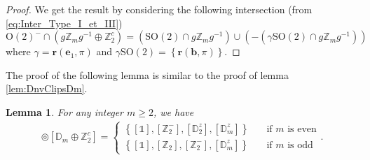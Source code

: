 \documentclass[11pt,a4paper]{amsart}
\newtheorem{lem}[thm]{Lemma}
\theoremstyle{definition}
\newcommand{\ZZ}{\mathbb{Z}}                %
\newcommand{\OO}{\mathrm{O}}                %
\newcommand{\SO}{\mathrm{SO}}               %
\newcommand{\DD}{\mathbb{D}}                %
\newcommand{\1}{\mathds{1}}		            %
\newcommand{\ee}{\pmb{e}}                   %
\newcommand{\vR}{\mathbf{r}}
\newcommand{\bb}{\mathbf{b}}
\newcommand{\set}[1]{\left\{#1\right\}}     %
\begin{document}
\begin{proof}
  We get the result by considering the following intersection (from \eqref{eq:Inter_Type_I_et_III})
  \begin{equation*}
    \OO(2)^-\cap (g\ZZ_m g^{-1} \oplus \ZZ_2^c)=(\SO(2) \cap g \ZZ_m g^{-1})\cup (-(\gamma\SO(2)\cap g\ZZ_mg^{-1}))
  \end{equation*}
  where $\gamma=\vR(\ee_1,\pi)$ and $\gamma\SO(2)=\set{\vR(\bb,\pi)}$.
\end{proof}

The proof of the following lemma is similar to the proof of lemma \ref{lem:DnvClipsDm}.
\begin{lem}
  For any integer $m\geq 2$, we have
  \begin{align*}
    [\OO(2)^-]\circledcirc [\DD_m\oplus \ZZ_2^c]=
    \begin{cases}
      \set{[\1],[\ZZ_2^-],[\DD_2^z],[\DD_m^z]} \quad & \text{if $m$ is even} \\
      \set{[\1],[\ZZ_2],[\ZZ_2^-],[\DD_m^z]} \quad   & \text{if $m$ is odd}
    \end{cases} .
  \end{align*}
\end{lem}
\end{document}
